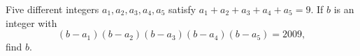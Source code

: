 Five different integers $a_1,a_2,a_3,a_4,a_5$ satisfy $a_1+a_2+a_3+a_4+a_5=9$. If $b$ is an integer with
\[
(b-a_1)(b-a_2)(b-a_3)(b-a_4)(b-a_5)=2009,
\]
find $b$.
